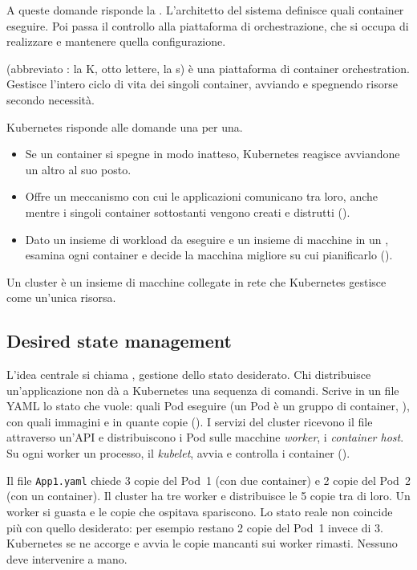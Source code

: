 A queste domande risponde la . L'architetto del sistema definisce quali container
eseguire. Poi passa il controllo alla piattaforma di orchestrazione, che si occupa di realizzare e mantenere quella
configurazione.

\begin{definizione}[Kubernetes]
 (abbreviato : la K, otto lettere, la s) è una piattaforma di container
orchestration. Gestisce l'intero ciclo di vita dei singoli container, avviando e spegnendo risorse secondo necessità.
\end{definizione}

Kubernetes risponde alle domande una per una.
\begin{itemize}
  \item Se un container si spegne in modo inatteso, Kubernetes reagisce avviandone un altro al suo posto.
  \item Offre un meccanismo con cui le applicazioni comunicano tra loro, anche mentre i singoli container sottostanti
    vengono creati e distrutti ().
  \item Dato un insieme di workload da eseguire e un insieme di macchine in un , esamina ogni
    container e decide la macchina migliore su cui pianificarlo ().
\end{itemize}
Un cluster è un insieme di macchine collegate in rete che Kubernetes gestisce come un'unica risorsa.

\subsection{Desired state management\aggiunta}
\label{sec:k8s-stato}

L'idea centrale si chiama , gestione dello stato desiderato. Chi distribuisce
un'applicazione non dà a Kubernetes una sequenza di comandi. Scrive in un file YAML lo stato che vuole: quali Pod
eseguire (un Pod è un gruppo di container, ), con quali immagini e in quante copie ().
I servizi del cluster ricevono il file attraverso un'API e distribuiscono i Pod sulle macchine \emph{worker}, i
\emph{container host}. Su ogni worker un processo, il \emph{kubelet}, avvia e controlla i container
().

\begin{esempio}
Il file \texttt{App1.yaml} chiede 3 copie del Pod~1 (con due container) e 2 copie del Pod~2 (con un container). Il
cluster ha tre worker e distribuisce le 5 copie tra di loro. Un worker si guasta e le copie che ospitava spariscono.
Lo stato reale non coincide più con quello desiderato: per esempio restano 2 copie del Pod~1 invece di 3.
Kubernetes se ne accorge e avvia le copie mancanti sui worker rimasti. Nessuno deve intervenire a mano.
\end{esempio}

